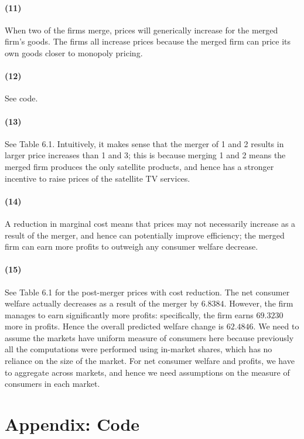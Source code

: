 \documentclass[10pt,letter]{article}
\begin{document}
\paragraph{(11)} When two of the firms merge, prices will generically increase for the merged firm's goods. The firms all increase prices because the merged firm can price its own goods closer to monopoly pricing.
\paragraph{(12)} See code.
\paragraph{(13)} See Table 6.1. Intuitively, it makes sense that the merger of 1 and 2 results in larger price increases than 1 and 3; this is because merging 1 and 2 means the merged firm produces the only satellite products, and hence has a stronger incentive to raise prices of the satellite TV services.
\paragraph{(14)} A reduction in marginal cost means that prices may not necessarily increase as a result of the merger, and hence can potentially improve efficiency; the merged firm can earn more profits to outweigh any consumer welfare decrease.
\paragraph{(15)} See Table 6.1 for the post-merger prices with cost reduction. The net consumer welfare actually decreases as a result of the merger by $6.8384$. However, the firm manages to earn significantly more profits: specifically, the firm earns $69.3230$ more in profits. Hence the overall predicted welfare change is $62.4846$. We need to assume the markets have uniform measure of consumers here because previously all the computations were performed using in-market shares, which has no reliance on the size of the market. For net consumer welfare and profits, we have to aggregate across markets, and hence we need assumptions on the measure of consumers in each market.


\section*{Appendix: Code}

\end{document}
